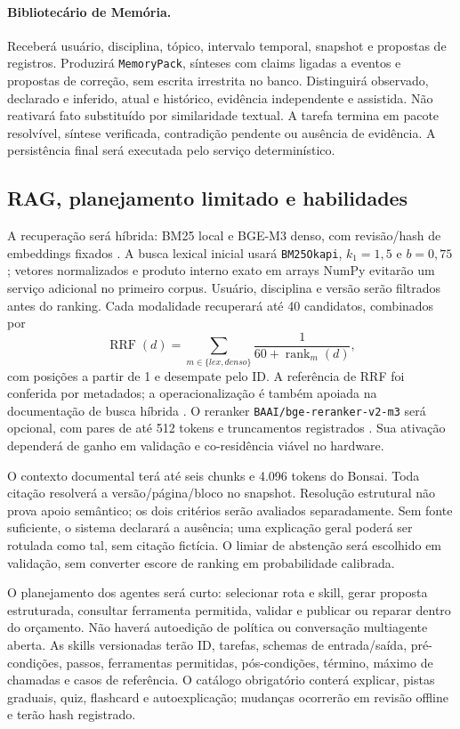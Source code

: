 \documentclass[12pt]{article}
\let\cite\citep
\newcommand{\code}[1]{\nolinkurl{#1}}
\begin{document}
\paragraph{Bibliotecário de Memória.}
Receberá usuário, disciplina, tópico, intervalo temporal, snapshot e propostas de registros. Produzirá \code{MemoryPack}, sínteses com claims ligadas a eventos e propostas de correção, sem escrita irrestrita no banco. Distinguirá observado, declarado e inferido, atual e histórico, evidência independente e assistida. Não reativará fato substituído por similaridade textual. A tarefa termina em pacote resolvível, síntese verificada, contradição pendente ou ausência de evidência. A persistência final será executada pelo serviço determinístico.

\subsection{RAG, planejamento limitado e habilidades}

A recuperação será híbrida: BM25 local e BGE-M3 denso, com revisão/hash de embeddings fixados \cite{m3}. A busca lexical inicial usará \code{BM25Okapi}, $k_1=1{,}5$ e $b=0{,}75$; vetores normalizados e produto interno exato em arrays NumPy evitarão um serviço adicional no primeiro corpus. Usuário, disciplina e versão serão filtrados antes do ranking. Cada modalidade recuperará até 40 candidatos, combinados por
\begin{equation}
 \operatorname{RRF}(d)=\sum_{m\in\{lex,denso\}}\frac{1}{60+\operatorname{rank}_m(d)},
\end{equation}
com posições a partir de 1 e desempate pelo ID. A referência de RRF foi conferida por metadados; a operacionalização é também apoiada na documentação de busca híbrida \cite{rrf09,qdranthyb}. O reranker \code{BAAI/bge-reranker-v2-m3} será opcional, com pares de até 512 tokens e truncamentos registrados \cite{bgerank}. Sua ativação dependerá de ganho em validação e co-residência viável no hardware.

O contexto documental terá até seis chunks e 4.096 tokens do Bonsai. Toda citação resolverá a versão/página/bloco no snapshot. Resolução estrutural não prova apoio semântico; os dois critérios serão avaliados separadamente. Sem fonte suficiente, o sistema declarará a ausência; uma explicação geral poderá ser rotulada como tal, sem citação fictícia. O limiar de abstenção será escolhido em validação, sem converter escore de ranking em probabilidade calibrada.

O planejamento dos agentes será curto: selecionar rota e skill, gerar proposta estruturada, consultar ferramenta permitida, validar e publicar ou reparar dentro do orçamento. Não haverá autoedição de política ou conversação multiagente aberta. As skills versionadas terão ID, tarefas, schemas de entrada/saída, pré-condições, passos, ferramentas permitidas, pós-condições, término, máximo de chamadas e casos de referência. O catálogo obrigatório conterá explicar, pistas graduais, quiz, flashcard e autoexplicação; mudanças ocorrerão em revisão offline e terão hash registrado.
\end{document}
